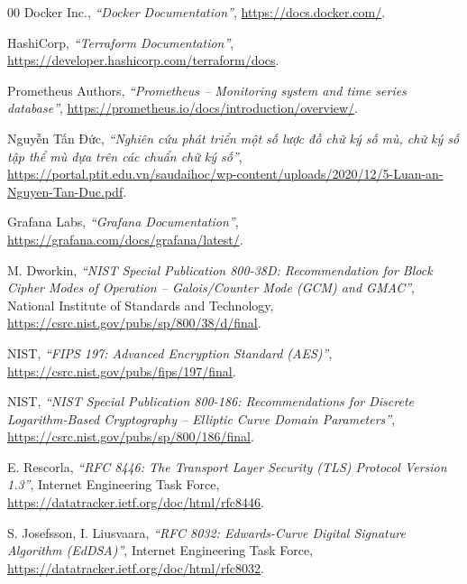 \begin{thebibliography}{00}
 Docker Inc., \textit{``Docker Documentation''}, \url{https://docs.docker.com/}.

 HashiCorp, \textit{``Terraform Documentation''}, \url{https://developer.hashicorp.com/terraform/docs}.

 Prometheus Authors, \textit{``Prometheus -- Monitoring system and time series database''}, \url{https://prometheus.io/docs/introduction/overview/}.

 Nguyễn Tấn Đức, \textit{``Nghiên cứu phát triển một số lược đồ chữ ký số mù, chữ ký số tập thể mù dựa trên các chuẩn chữ ký số''}, \url{https://portal.ptit.edu.vn/saudaihoc/wp-content/uploads/2020/12/5-Luan-an-Nguyen-Tan-Duc.pdf}.

 Grafana Labs, \textit{``Grafana Documentation''}, \url{https://grafana.com/docs/grafana/latest/}.

 M. Dworkin, \textit{``NIST Special Publication 800-38D: Recommendation for Block Cipher Modes of Operation -- Galois/Counter Mode (GCM) and GMAC''}, National Institute of Standards and Technology, \url{https://csrc.nist.gov/pubs/sp/800/38/d/final}.

 NIST, \textit{``FIPS 197: Advanced Encryption Standard (AES)''}, \url{https://csrc.nist.gov/pubs/fips/197/final}.

 NIST, \textit{``NIST Special Publication 800-186: Recommendations for Discrete Logarithm-Based Cryptography -- Elliptic Curve Domain Parameters''}, \url{https://csrc.nist.gov/pubs/sp/800/186/final}.

 E. Rescorla, \textit{``RFC 8446: The Transport Layer Security (TLS) Protocol Version 1.3''}, Internet Engineering Task Force, \url{https://datatracker.ietf.org/doc/html/rfc8446}.

 S. Josefsson, I. Liusvaara, \textit{``RFC 8032: Edwards-Curve Digital Signature Algorithm (EdDSA)''}, Internet Engineering Task Force, \url{https://datatracker.ietf.org/doc/html/rfc8032}.

\end{thebibliography}
